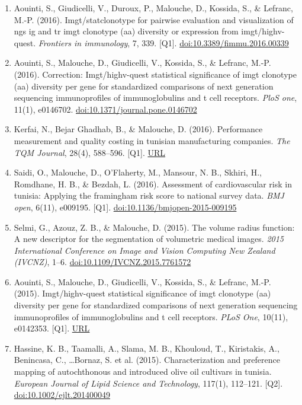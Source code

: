 \documentclass[11pt,a4paper,sans]{moderncv}
\begin{document}
\begin{enumerate}
\item Aouinti, S., Giudicelli, V., Duroux, P., Malouche, D., Kossida, S., \& Lefranc, M.-P. (2016). Imgt/statclonotype for pairwise evaluation and visualization of ngs ig and tr imgt clonotype (aa) diversity or expression from imgt/highv-quest. \textit{Frontiers in immunology}, 7, 339. [Q1]. \href{https://doi.org/10.3389/fimmu.2016.00339}{doi:10.3389/fimmu.2016.00339}
\item Aouinti, S., Malouche, D., Giudicelli, V., Kossida, S., \& Lefranc, M.-P. (2016). Correction: Imgt/highv-quest statistical significance of imgt clonotype (aa) diversity per gene for standardized comparisons of next generation sequencing immunoprofiles of immunoglobulins and t cell receptors. \textit{PloS one}, 11(1), e0146702. \href{https://doi.org/10.1371/journal.pone.0146702}{doi:10.1371/journal.pone.0146702}
\item Kerfai, N., Bejar Ghadhab, B., \& Malouche, D. (2016). Performance measurement and quality costing in tunisian manufacturing companies. \textit{The TQM Journal}, 28(4), 588–596. [Q1]. \href{https://www.emerald.com/insight/content/doi/10.1108/TQM-10-2013-0119/full/html}{URL}
\item Saidi, O., Malouche, D., O'Flaherty, M., Mansour, N. B., Skhiri, H., Romdhane, H. B., \& Bezdah, L. (2016). Assessment of cardiovascular risk in tunisia: Applying the framingham risk score to national survey data. \textit{BMJ open}, 6(11), e009195. [Q1]. \href{https://doi.org/10.1136/bmjopen-2015-009195}{doi:10.1136/bmjopen-2015-009195}
\item Selmi, G., Azouz, Z. B., \& Malouche, D. (2015). The volume radius function: A new descriptor for the segmentation of volumetric medical images. \textit{2015 International Conference on Image and Vision Computing New Zealand (IVCNZ)}, 1–6. \href{https://doi.org/10.1109/IVCNZ.2015.7761572}{doi:10.1109/IVCNZ.2015.7761572}
\item Aouinti, S., Malouche, D., Giudicelli, V., Kossida, S., \& Lefranc, M.-P. (2015). Imgt/highv-quest statistical significance of imgt clonotype (aa) diversity per gene for standardized comparisons of next generation sequencing immunoprofiles of immunoglobulins and t cell receptors. \textit{PLoS One}, 10(11), e0142353. [Q1]. \href{https://pubmed.ncbi.nlm.nih.gov/26540440/}{URL}
\item Hassine, K. B., Taamalli, A., Slama, M. B., Khouloud, T., Kiristakis, A., Benincasa, C., \ldots Bornaz, S. et al. (2015). Characterization and preference mapping of autochthonous and introduced olive oil cultivars in tunisia. \textit{European Journal of Lipid Science and Technology}, 117(1), 112–121. [Q2]. \href{https://doi.org/10.1002/ejlt.201400049}{doi:10.1002/ejlt.201400049}

\end{enumerate}
\end{document}
